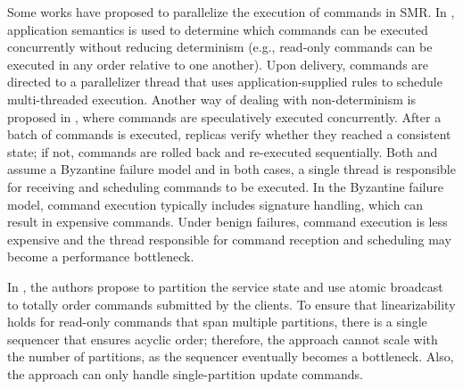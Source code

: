 Some works have proposed to parallelize the execution of commands in SMR. 
In \cite{kotla2004htbft}, application semantics is used to determine which commands can be executed concurrently without reducing determinism (e.g., read-only commands can be executed in any order relative to one another). 
Upon delivery, commands are directed to a parallelizer thread that uses application-supplied rules to schedule multi-threaded execution. 
Another way of dealing with non-determinism is proposed in \cite{kapritzos2012eve}, where commands are speculatively executed concurrently.
After a batch of commands is executed, replicas verify whether they reached a consistent state; if not, commands are rolled back and re-executed sequentially. 
Both \cite{kotla2004htbft} and \cite{kapritzos2012eve} assume a Byzantine failure model and in both cases, a single thread is responsible for receiving and scheduling commands to be executed. 
In the Byzantine failure model, command execution typically includes signature handling, which can result in expensive commands.
Under benign failures, command execution is less expensive and the thread responsible for command reception and scheduling may become a performance bottleneck.

In \cite{Marandi11}, the authors propose to partition the service state and use atomic broadcast to totally order commands submitted by the clients. 
To ensure that linearizability holds for read-only commands that span multiple partitions, there is a single sequencer that ensures acyclic order; therefore, the approach cannot scale with the number of partitions, as the sequencer eventually becomes a bottleneck.
Also, the approach can only handle single-partition update commands.



